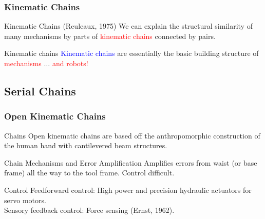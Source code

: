 \begin{frame}
	\frametitle{Kinematic Chains}
	\begin{block}{Kinematic Chains (Reuleaux, 1975)}
			We can explain the structural similarity of many mechanisms by parts of \textcolor{red}{kinematic chains} connected by pairs.
	\end{block}
	\begin{block}{Kinematic chains}
		\textcolor{blue}{Kinematic chains} are essentially the basic building structure of \textcolor{red}{mechanisms} $\ldots$ \textcolor{red}{and robots!} 
	\end{block}
\end{frame}
	

\subsection{Serial Chains}
	\begin{frame}
		\frametitle{Open Kinematic Chains}
		\begin{block}{Chains}
			Open kinematic chains are based off the anthropomorphic construction of the human hand with cantilevered beam structures.
		\end{block}
		\begin{block}{Chain Mechanisms and Error Amplification}
			Amplifies errors from waist (or base frame) all the way to the tool frame. Control difficult. 
		\end{block}
		\begin{block}{Control}
			Feedforward control: High power and precision hydraulic actuators for servo motors. \\
			Sensory feedback control: Force sensing (Ernst, 1962). 
		\end{block}
	\end{frame}
	
